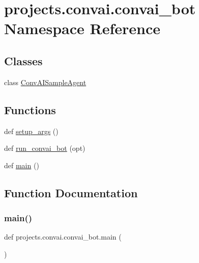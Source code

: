 \hypertarget{namespaceprojects_1_1convai_1_1convai__bot}{}\section{projects.\+convai.\+convai\+\_\+bot Namespace Reference}
\label{namespaceprojects_1_1convai_1_1convai__bot}
\subsection*{Classes}
\begin{DoxyCompactItemize}
\item 
class \hyperlink{classprojects_1_1convai_1_1convai__bot_1_1ConvAISampleAgent}{Conv\+A\+I\+Sample\+Agent}
\end{DoxyCompactItemize}
\subsection*{Functions}
\begin{DoxyCompactItemize}
\item 
def \hyperlink{namespaceprojects_1_1convai_1_1convai__bot_abb3f83d4277a55c3f972f0f77d9066a7}{setup\+\_\+args} ()
\item 
def \hyperlink{namespaceprojects_1_1convai_1_1convai__bot_a370a74521f78bc526eb9264aeb289f65}{run\+\_\+convai\+\_\+bot} (opt)
\item 
def \hyperlink{namespaceprojects_1_1convai_1_1convai__bot_a20f231e61b1255f9d9a5de5e77f063bf}{main} ()
\end{DoxyCompactItemize}


\subsection{Function Documentation}
\mbox{\label{namespaceprojects_1_1convai_1_1convai__bot_a20f231e61b1255f9d9a5de5e77f063bf}} 
\subsubsection{\texorpdfstring{main()}{main()}}
{\footnotesize\ttfamily def projects.\+convai.\+convai\+\_\+bot.\+main (\begin{DoxyParamCaption}{ }\end{DoxyParamCaption})}

